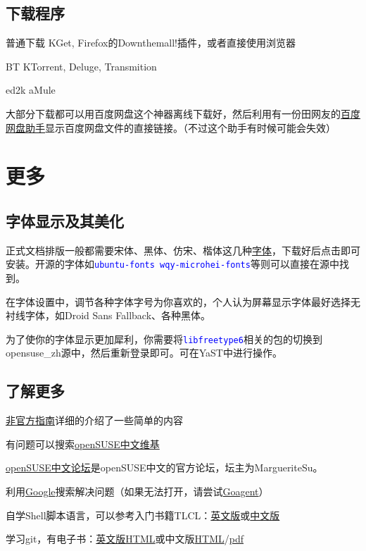 \documentclass[10pt,openany]{book}
\newcommand{\soft}[1]{\texttt{\textcolor{blue}{#1}}}
\begin{document}
\section{下载程序}
\begin{compactdesc}
 \item[普通下载] KGet, Firefox的Down\-them\-all!插件，或者直接使用浏览器
 \item[BT] KTorrent, Deluge, Transmition
 \item[ed2k] aMule
\end{compactdesc}

大部分下载都可以用百度网盘这个神器离线下载好，然后利用有一份田网友的\href{http://git.oschina.net/youyifentian/dupanlink}{百度网盘助手}显示百度网盘文件的直接链接。（不过这个助手有时候可能会失效）
\chapter{更多}
\section{字体显示及其美化}
正式文档排版一般都需要宋体、黑体、仿宋、楷体这几种\href{http://pan.baidu.com/s/1mgiHWmO}{字体}，下载好后点击即可安装。开源的字体如\soft{ubuntu-fonts wqy-microhei-fonts}等则可以直接在源中找到。

在字体设置中，调节各种字体字号为你喜欢的，个人认为屏幕显示字体最好选择无衬线字体，如Droid Sans Fallback、各种黑体。

为了使你的字体显示更加犀利，你需要将\soft{libfreetype6}相关的包的切换到opensuse\_zh源中，然后重新登录即可。可在YaST中进行操作。

\section{了解更多}
\begin{compactitem}
 \item \href{https://lug.ustc.edu.cn/sites/opensuse-guide/}{非官方指南}详细的介绍了一些简单的内容
 \item 有问题可以搜索\href{https://zh.opensuse.org/%E9%A6%96%E9%A1%B5}{openSUSE中文维基}
 \item \href{https://forum.suse.org.cn/}{openSUSE中文论坛}是openSUSE中文的官方论坛，坛主为MargueriteSu。
 \item 利用\href{https://google.com}{Google}搜索解决问题（如果无法打开，请尝试\href{https://code.google.com/p/goagent/}{Goagent}）
 \item 自学Shell脚本语言，可以参考入门书籍TLCL：\href{http://home.ustc.edu.cn/~zpj/doc/Linux/The_Linux_Command_Line.pdf}{英文版}或\href{http://home.ustc.edu.cn/~zpj/doc/Linux/The_Linux_Command_Line(%e4%b8%ad%e6%96%87%e7%89%88).pdf}{中文版}
 \item 学习git，有电子书：\href{http://git-scm.com/book/}{英文版HTML}或中文版\href{http://git-scm.com/book/zh}{HTML}/\href{http://liam0205.me/attachment/Git/progit.zh.pdf}{pdf}
\end{compactitem}
\end{document}
